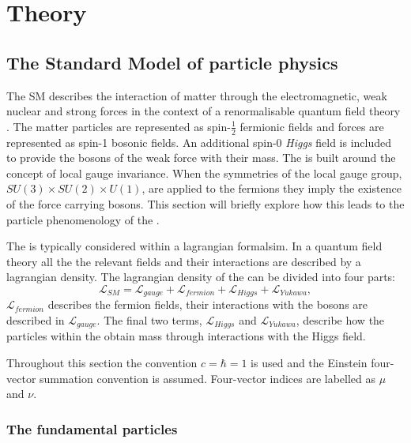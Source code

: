 \chapter{Theory}
\label{chap:theory}


\section{The Standard Model of particle physics}
\label{sec:sm}

The \acf{SM} describes the interaction of matter through the
electromagnetic, weak nuclear and strong forces in the context of a
renormalisable quantum field theory
\cite{Salam:1964ry,Glashow:1961tr,PhysRevLett.19.1264}. The matter
particles are represented as spin-$\frac{1}{2}$ fermionic fields and
forces are represented as spin-1 bosonic fields. An additional spin-0
\emph{Higgs} field is included to provide the bosons of the weak force
with their mass. The \SM is built around the concept of local gauge
invariance. When the symmetries of the \SM local gauge group,
$SU(3)\times SU(2) \times U(1)$, are applied to the fermions they
imply the existence of the force carrying bosons. This section will
briefly explore how this leads to the particle phenomenology of the
\SM.

The \SM is typically considered within a lagrangian formalsim. In a
quantum field theory all the the relevant fields and their
interactions are described by a lagrangian density. The lagrangian
density of the \SM can be divided into four parts:
\begin{equation}
\mathcal{L}_{SM}=\mathcal{L}_{gauge}+\mathcal{L}_{fermion}+\mathcal{L}_{Higgs}+\mathcal{L}_{Yukawa},
\end{equation}
$\mathcal{L}_{fermion}$ describes the fermion
fields, their interactions with the bosons are described in
$\mathcal{L}_{gauge}$. The final two terms, $\mathcal{L}_{Higgs}$ and
$\mathcal{L}_{Yukawa}$, describe how the particles within the \SM
obtain mass through interactions with the Higgs field.

Throughout this section the convention $c=\hbar = 1$ is used and the
Einstein four-vector summation convention is assumed. Four-vector indices
are labelled as $\mu$ and $\nu$.

\subsection{The fundamental particles}

